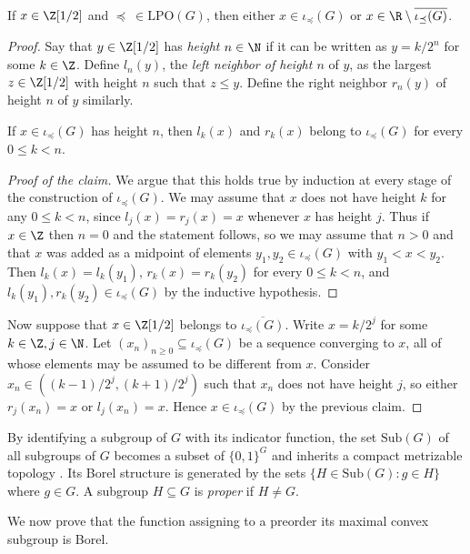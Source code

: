 \documentclass[reqno]{amsart}
\begin{document}
\begin{lema} \label{lema:iota}
If $x \in \Z[1/2]$ and $\preceq \  \in \mathrm{LPO}(G)$, then either $x \in \iota_\preceq(G)$ or $x \in \R \setminus \overline{\iota_\preceq(G)}$.
\end{lema}
\begin{proof}
	Say that $y \in \Z[1/2]$ has \emph{height} $n \in \N$ if it can be written as $y = k/2^n$ for some $k \in \Z$. Define $l_n(y)$, the \emph{left neighbor of height $n$} of $y$, as the largest $z \in \Z[1/2]$ with height $n$ such that $z \leq y$. Define the right neighbor $r_n(y)$ of height $n$ of $y$ similarly.
\begin{claim}
	If $x \in \iota_\preceq(G)$ has height $n$, then $l_k(x)$ and $r_k(x)$ belong to $\iota_\preceq(G)$ for every $0 \leq k < n$.
\end{claim}
\begin{proof}[Proof of the claim]
	We argue that this holds true by induction at every stage of the construction of $\iota_\preceq(G)$. We may assume that $x$ does not have height $k$ for any $0 \leq k < n$, since $l_j(x) = r_j(x) = x$ whenever $x$ has height $j$. Thus if $x \in \Z$ then $n = 0$ and the statement follows, so we may assume that $n > 0$ and that $x$ was added as a midpoint of elements $y_1, y_2 \in \iota_\preceq(G)$ with $y_1 < x < y_2$. Then $l_{k}(x) = l_k(y_1),\, r_{k}(x) = r_k(y_2)$ for every $0 \leq k < n$, and $l_k(y_1), r_k(y_2) \in \iota_\preceq(G)$ by the inductive hypothesis.
\end{proof}
Now suppose that $x \in \Z[1/2]$ belongs to $\overline{\iota_\preceq(G)}$. Write $x = k/2^j$ for some $k \in \Z, j \in \N$. Let $(x_n)_{n \geq 0} \subseteq \iota_\preceq(G)$ be a sequence converging to $x$, all of whose elements may be assumed to be different from $x$. Consider $x_n \in ((k-1)/2^j, (k+1)/2^j)$ such that $x_n$ does not have height $j$, so either $r_j(x_n) = x$ or $l_j(x_n) = x$. Hence $x \in \iota_\preceq(G)$ by the previous claim.
\end{proof}

By identifying a subgroup of $G$ with its indicator function, the set $\mathrm{Sub}(G)$ of all subgroups of $G$ becomes a subset of $\{0,1\}^G$ and inherits a compact metrizable topology \cite{Chabauty1950}. Its Borel structure is generated by the sets $\{H \in \mathrm{Sub}(G) : g \in H\}$ where $g \in G$. A subgroup $H \subseteq G$ is \emph{proper} if $H \neq G$.

We now prove that the function assigning to a preorder its maximal convex subgroup is Borel.
\end{document}
